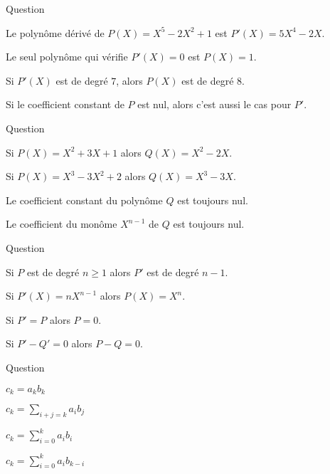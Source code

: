 \begin{multi}[multiple,feedback=
{Le polynôme dérivé s'obtient comme si on dérivait la fonction \(X \mapsto P(X)\). 
}]{Question}
    \item Le polynôme dérivé de \(P(X) = X^5-2X^2+1\) est \(P'(X)=5X^4-2X\).
    \item Le seul polynôme qui vérifie \(P'(X)=0\) est \(P(X)=1\).
    \item* Si \(P'(X)\) est de degré \(7\), alors \(P(X)\) est de degré \(8\).
    \item Si le coefficient constant de \(P\) est nul, alors c'est aussi le cas pour \(P'\).
\end{multi}


\begin{multi}[multiple,feedback=
{Cette transformation est faite afin que le coefficient du monôme \(X^{n-1}\) de \(Q\) soit toujours nul.
}]{Question}
    \item Si \(P(X) = X^2+3X+1\) alors \(Q(X) = X^2-2X\).
    \item* Si \(P(X) = X^3-3X^2+2\) alors \(Q(X) = X^3-3X\).
    \item Le coefficient constant du polynôme \(Q\) est toujours nul.
    \item* Le coefficient du monôme \(X^{n-1}\) de \(Q\) est toujours nul.
\end{multi}


\begin{multi}[multiple,feedback=
{C'est comme pour les primitives, il ne faut pas oublier la constante :
Si \(P'=Q'\) alors \(P=Q +c\).
}]{Question}
    \item* Si \(P\) est de degré \(n\ge1\) alors \(P'\) est de degré \(n-1\).
    \item Si \(P'(X) = nX^{n-1}\) alors \(P(X) = X^n\).
    \item* Si \(P'=P\) alors \(P=0\).
    \item Si \(P'-Q'=0\) alors \(P-Q=0\).
\end{multi}


\begin{multi}[multiple,feedback=
{La formule (à connaître) est 
\[c_k = \sum_{i+j=k} a_ib_j = \sum_{i=0}^k a_ib_{k-i}.\]
}]{Question}
    \item \(c_k = a_k b_k\)
    \item* \(c_k = \sum_{i+j=k} a_ib_j\)
    \item \(c_k = \sum_{i=0}^k a_ib_i\)
    \item* \(c_k = \sum_{i=0}^k a_ib_{k-i}\)
\end{multi}


